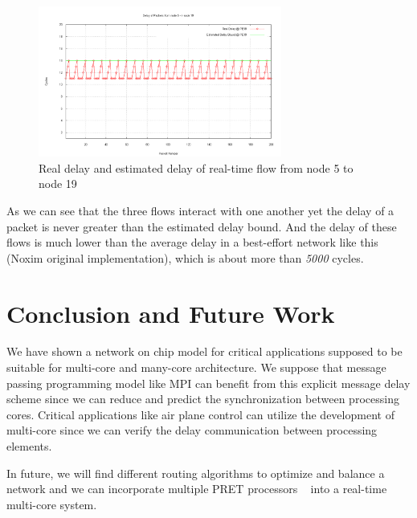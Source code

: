 \documentclass[conference, twocolumn]{IEEEtran}
\theoremstyle{definition}
\begin{document}
\begin{figure}[htp]
\centering
\includegraphics[width=8cm]{pics/PE19.png}
\caption[Three flows example.]
{Real delay and estimated delay of real-time flow from node
5 to node 19}\label{fig:PE5PE19}
\end{figure}

As we can see that the three flows interact with one another yet the delay of a
packet is never greater than the estimated delay bound. And the delay of these
flows is much lower than the average delay in a best-effort network like
this (Noxim original implementation), which is about more than {\em 5000}
cycles.

\section{Conclusion and Future Work}
We have shown a network on chip model for critical applications supposed to be
suitable for multi-core and many-core architecture. We suppose that message
passing programming model like MPI can benefit from this explicit message
delay scheme since we can reduce and predict the synchronization between
processing cores. Critical applications like air plane control can utilize the
development of multi-core since we can verify the delay communication between
processing elements.

In future, we will find different routing algorithms to optimize and balance a
network and we can incorporate multiple PRET processors ~\cite{LicklyPRET} into
a real-time multi-core system.



\end{document}
